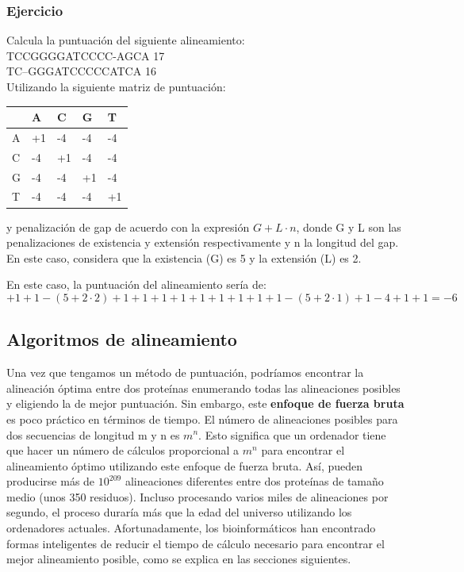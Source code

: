 \subsubsection{Ejercicio}
Calcula la puntuación del siguiente alineamiento: \\
TCCGGGGATCCCC-AGCA 17\\
TC--GGGATCCCCCATCA 16\\ 
Utilizando la siguiente matriz de puntuación:

\begin{table}[htbp]
    \centering
    \begin{tabularx}{\textwidth}{ X X X X X}
          & A & C & G & T \\ \hline
         A & +1 & -4 & -4 & -4 \\
         C & -4 & +1 & -4 & -4 \\
         G & -4 & -4 & +1 & -4 \\
         T & -4 & -4 & -4 & +1 \\
    \end{tabularx}
\end{table}

y penalización de gap de acuerdo con la expresión $G+L \cdot n$, donde G y L son las penalizaciones de existencia y extensión respectivamente y n la longitud del gap. En este caso, considera que la existencia (G) es 5 y la extensión (L) es 2. 

En este caso, la puntuación del alineamiento sería de:
$$+1 +1 -(5 +2 \cdot 2) +1 +1 +1 +1 +1 +1 +1 +1 +1 -(5 +2 \cdot 1) +1 -4 +1 +1 = -6$$

\subsection{Algoritmos de alineamiento}
Una vez que tengamos un método de puntuación, podríamos encontrar la alineación óptima entre dos proteínas enumerando todas las alineaciones posibles y eligiendo la de mejor puntuación. Sin embargo, este \textbf{enfoque de fuerza bruta} es poco práctico en términos de tiempo. El número de alineaciones posibles para dos secuencias de longitud m y n es $m^n$. Esto significa que un ordenador tiene que hacer un número de cálculos proporcional a $m^n$ para encontrar el alineamiento óptimo utilizando este enfoque de fuerza bruta. Así, pueden producirse más de $10^209$ alineaciones diferentes entre dos proteínas de tamaño medio (unos 350 residuos). Incluso procesando varios miles de alineaciones por segundo, el proceso duraría más que la edad del universo utilizando los ordenadores actuales. Afortunadamente, los bioinformáticos han encontrado formas inteligentes de reducir el tiempo de cálculo necesario para encontrar el mejor alineamiento posible, como se explica en las secciones siguientes.

